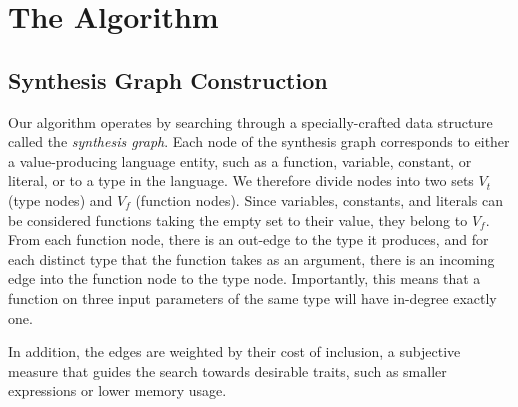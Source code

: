 \section{The Algorithm}
\label{sec:algorithm}
\subsection{Synthesis Graph Construction}
\label{sec:algorithm:graph}

Our algorithm operates by searching through a specially-crafted data structure called the {\emph{synthesis graph}}. Each node of the synthesis graph corresponds to either a value-producing language entity, such as a function, variable, constant, or literal, or to a type in the language. We therefore divide nodes into two sets $V_t$ (type nodes) and $V_f$ (function nodes). Since variables, constants, and literals can be considered functions taking the empty set to their value, they belong to $V_f$. From each function node, there is an out-edge to the type it produces, and for each distinct type that the function takes as an argument, there is an incoming edge into the function node to the type node. Importantly, this means that a function on three input parameters of the same type will have in-degree exactly one.

In addition, the edges are weighted by their cost of inclusion, a subjective measure that guides the search towards desirable traits, such as smaller expressions or lower memory usage.


